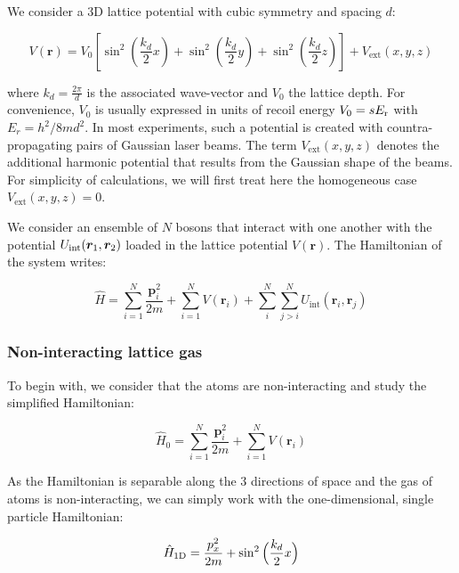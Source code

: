 \label{sec:BH_model}

We consider a 3D lattice potential with cubic symmetry and spacing $d$:

\begin{equation}
    V(\bm{r})=V_{0}\left[\sin ^{2}\left(\frac{k_{d}}{2} x\right)+\sin ^{2}\left(\frac{k_{d}}{2} y\right)+\sin ^{2}\left(\frac{k_{d}}{2} z\right)\right] + V_{\mathrm{ext}} (x,y,z)
\end{equation}

\noindent where $k_d=\frac{2 \pi}{d}$ is the associated wave-vector and $V_0$ the lattice depth. For convenience, $V_0$ is usually expressed in units of recoil energy $V_0 = s E_{\rm{r}}$ with $E_r=h^2/ 8 m d^2$. In most experiments, such a potential is created with countra-propagating pairs of Gaussian laser beams. The term $V_{\mathrm{ext}} (x,y,z)$ denotes the additional harmonic potential that results from the Gaussian shape of the beams. For simplicity of calculations, we will first treat here the homogeneous case $V_{\mathrm{ext}} (x,y,z)=0$.

We consider an ensemble of $N$ bosons that interact with one another with the potential $U_{\rm{int}} ( \bm{r}_1, \bm{r}_2)$ loaded in the lattice potential $V(\bm{r})$. The Hamiltonian of the system writes:

\begin{equation}
    \hat{H}=\sum_{i=1}^{N} \frac{\bm{p}_{i}^{2}}{2 m}+\sum_{i=1}^{N} V\left(\bm{r}_{i}\right) + \sum_{i}^{N} \sum_{j>i}^{N} U_{\text{int}}\left(\bm{r}_{i}, \bm{r}_{j}\right)
    \label{eq:H_lattice_full}
\end{equation}

\subsubsection{Non-interacting lattice gas}

To begin with, we consider that the atoms are non-interacting and study the simplified Hamiltonian:

\begin{equation}
    \hat{H}_0=\sum_{i=1}^{N} \frac{\bm{p}_{i}^{2}}{2 m}+\sum_{i=1}^{N} V\left(\bm{r}_{i}\right)
\end{equation}

\noindent As the Hamiltonian is separable along the 3 directions of space and the gas of atoms is non-interacting, we can simply work with the one-dimensional, single particle Hamiltonian:

\begin{equation}
    \hat{H}_{\rm{1D}} = \frac{p_x^2}{2m} + \sin^2 \Big(\frac{k_d}{2} x \Big)
\end{equation}

